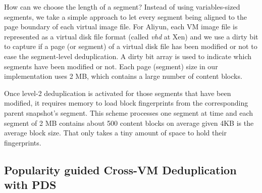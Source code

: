 How can we choose the length of a segment?
Instead of using variables-sized segments, we take a simple approach
to let every segment being aligned to the page boundary of each virtual image file.
For Aliyun, each VM image file is represented as a virtual disk file format
(called \emph{vhd} at Xen) and we use a dirty bit to capture if a page (or segment) of a virtual disk file 
has been modified or not to ease the segment-level deduplication.
A dirty bit array is used to indicate which segments have been modified or not. 
Each page (segment) size in our implementation uses 2 MB, which contains a large number of content blocks.



Once level-2 deduplication is activated for those segments that have been modified,
it requires memory to load  block fingerprints from the corresponding
parent snapshot's segment.
This scheme processes one segment at time and each segment of 2 MB contains about 
500 content blocks on average given 4KB is the average block size.
That only takes a tiny amount of space to hold their fingerprints.

\subsection{Popularity guided Cross-VM Deduplication with PDS}
\label{sect:crossVM}


